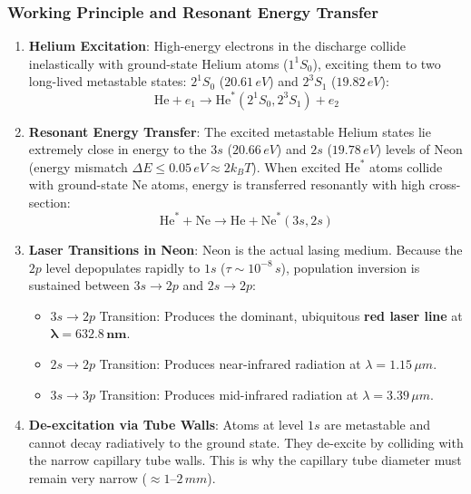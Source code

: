 \subsubsection{Working Principle and Resonant Energy Transfer}
\begin{enumerate}
    \item \textbf{Helium Excitation}: High-energy electrons in the discharge collide inelastically with ground-state Helium atoms ($1^1S_0$), exciting them to two long-lived metastable states: $2^1S_0$ ($20.61\,\si{eV}$) and $2^3S_1$ ($19.82\,\si{eV}$):
    \begin{equation}
        \text{He} + e_1 \longrightarrow \text{He}^* (2^1S_0, 2^3S_1) + e_2
    \end{equation}
    \item \textbf{Resonant Energy Transfer}: The excited metastable Helium states lie extremely close in energy to the $3s$ ($20.66\,\si{eV}$) and $2s$ ($19.78\,\si{eV}$) levels of Neon (energy mismatch $\Delta E \le 0.05\,\si{eV} \approx 2 k_B T$). When excited $\text{He}^*$ atoms collide with ground-state $\text{Ne}$ atoms, energy is transferred resonantly with high cross-section:
    \begin{equation}
        \text{He}^* + \text{Ne} \longrightarrow \text{He} + \text{Ne}^* (3s, 2s)
    \end{equation}
    \item \textbf{Laser Transitions in Neon}:
    Neon is the actual lasing medium. Because the $2p$ level depopulates rapidly to $1s$ ($\tau \sim 10^{-8}\,\si{s}$), population inversion is sustained between $3s \to 2p$ and $2s \to 2p$:
    \begin{itemize}
        \item $3s \to 2p$ Transition: Produces the dominant, ubiquitous \textbf{red laser line} at $\mathbf{\lambda = 632.8\,\si{nm}}$.
        \item $2s \to 2p$ Transition: Produces near-infrared radiation at $\lambda = 1.15\,\si{\mu m}$.
        \item $3s \to 3p$ Transition: Produces mid-infrared radiation at $\lambda = 3.39\,\si{\mu m}$.
    \end{itemize}
    \item \textbf{De-excitation via Tube Walls}:
    Atoms at level $1s$ are metastable and cannot decay radiatively to the ground state. They de-excite by colliding with the narrow capillary tube walls. This is why the capillary tube diameter must remain very narrow ($\approx 1\text{--}2\,\si{mm}$).
\end{enumerate}

